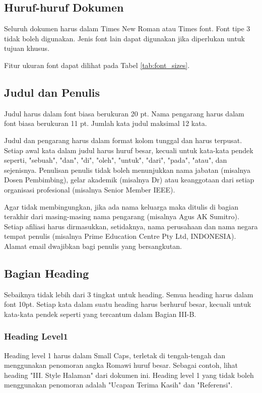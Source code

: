 \documentclass[10pt,twocolumn]{article}
\begin{document}
\subsection{Huruf-huruf Dokumen}
Seluruh dokumen harus dalam Times New Roman atau Times font. Font tipe 3 tidak boleh digunakan. Jenis font lain dapat digunakan jika diperlukan untuk tujuan khusus.

Fitur ukuran font dapat dilihat pada Tabel \ref{tab:font_sizes}.

\subsection{Judul dan Penulis}
Judul harus dalam font biasa berukuran 20 pt. Nama pengarang harus dalam font biasa berukuran 11 pt. Jumlah kata judul maksimal 12 kata.

Judul dan pengarang harus dalam format kolom tunggal dan harus terpusat. Setiap awal kata dalam judul harus huruf besar, kecuali untuk kata-kata pendek seperti, "sebuah", "dan", "di", "oleh", "untuk", "dari", "pada", "atau", dan sejenisnya. Penulisan penulis tidak boleh menunjukkan nama jabatan (misalnya Dosen Pembimbing), gelar akademik (misalnya Dr) atau keanggotaan dari setiap organisasi profesional (misalnya Senior Member IEEE).

Agar tidak membingungkan, jika ada nama keluarga maka ditulis di bagian terakhir dari masing-masing nama pengarang (misalnya Agus AK Sumitro). Setiap afiliasi harus dirmasukkan, setidaknya, nama perusahaan dan nama negara tempat penulis (misalnya Prime Education Centre Pty Ltd, INDONESIA). Alamat email dwajibkan bagi penulis yang bersangkutan.

\subsection{Bagian Heading}
Sebaiknya tidak lebih dari 3 tingkat untuk heading. Semua heading harus dalam font 10pt. Setiap kata dalam suatu heading harus berhuruf besar, kecuali untuk kata-kata pendek seperti yang tercantum dalam Bagian III-B.

\subsubsection{Heading Level1} Heading level 1 harus dalam Small Caps, terletak di tengah-tengah dan menggunakan penomoran angka Romawi huruf besar. Sebagai contoh, lihat heading "III. Style Halaman" dari dokumen ini. Heading level 1 yang tidak boleh menggunakan penomoran adalah "Ucapan Terima Kasih" dan "Referensi".
\end{document}
